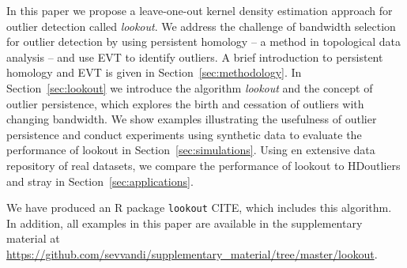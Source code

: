 \documentclass[letter,12pt]{article}
\begin{document}
In this paper we propose a leave-one-out kernel density estimation approach for outlier detection called \textit{lookout}. 
We address the challenge of bandwidth selection for outlier detection by using persistent homology -- a method in topological data analysis -- and use EVT to identify outliers.  A brief introduction to persistent homology and EVT is given in Section~\ref{sec:methodology}.
In Section~\ref{sec:lookout} we introduce the algorithm \textit{lookout} and the concept of outlier persistence, which explores the birth and cessation of outliers with changing bandwidth. 
We show examples illustrating the usefulness of outlier persistence and conduct experiments using synthetic data to evaluate the performance of lookout in  Section~\ref{sec:simulations}. Using en extensive data repository of real datasets, we compare the performance of lookout to HDoutliers and stray in Section~\ref{sec:applications}. 

We have produced an R package \texttt{lookout} CITE, which includes this algorithm. In addition, all examples in this paper are available in the supplementary material at \url{https://github.com/sevvandi/supplementary_material/tree/master/lookout}. 




\end{document}
